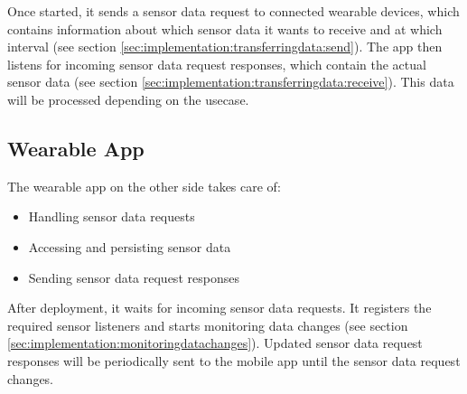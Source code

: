 Once started, it sends a sensor data request to connected wearable devices, which contains information about which sensor data it wants to receive and at which interval (see section \ref{sec:implementation:transferringdata:send}).
The app then listens for incoming sensor data request responses, which contain the actual sensor data (see section \ref{sec:implementation:transferringdata:receive}).
This data will be processed depending on the usecase.

\subsection{Wearable App}
\label{sec:concept:wearableapp}
The wearable app on the other side takes care of:
\begin{itemize}[noitemsep]
	\item Handling sensor data requests
	\item Accessing and persisting sensor data
	\item Sending sensor data request responses
\end{itemize}

After deployment, it waits for incoming sensor data requests.
It registers the required sensor listeners and starts monitoring data changes (see section \ref{sec:implementation:monitoringdatachanges}).
Updated sensor data request responses will be periodically sent to the mobile app until the sensor data request changes.

\clearpage